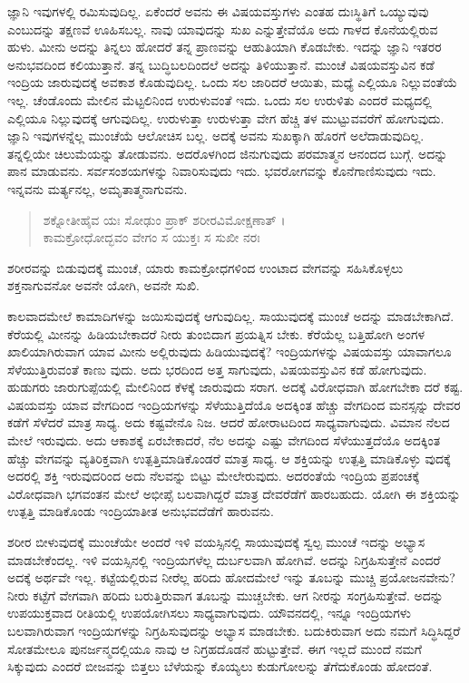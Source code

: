 ಜ್ಞಾನಿ ಇವುಗಳಲ್ಲಿ ರಮಿಸುವುದಿಲ್ಲ. ಏಕೆಂದರೆ ಅವನು ಈ ವಿಷಯವಸ್ತುಗಳು ಎಂತಹ ದುಃಸ್ಥಿತಿಗೆ ಒಯ್ಯುವುವು ಎಂಬುದನ್ನು ತಕ್ಷಣವೆ ಊಹಿಸಬಲ್ಲ. ನಾವು ಯಾವುದನ್ನು ಸುಖ ಎನ್ನುತ್ತೇವೆಯೊ ಅದು ಗಾಳದ ಕೊನೆಯಲ್ಲಿರುವ ಹುಳು. ಮೀನು ಅದನ್ನು ತಿನ್ನಲು ಹೋದರೆ ತನ್ನ ಪ್ರಾಣವನ್ನು ಆಹುತಿಯಾಗಿ ಕೊಡಬೇಕು. ಇದನ್ನು ಜ್ಞಾನಿ ಇತರರ ಅನುಭವದಿಂದ ಕಲಿಯುತ್ತಾನೆ. ತನ್ನ ಬುದ್ಧಿಬಲದಿಂದಲೆ ಅದನ್ನು ತಿಳಿಯುತ್ತಾನೆ. ಮುಂಚೆ ವಿಷಯವಸ್ತುವಿನ ಕಡೆ ಇಂದ್ರಿಯ ಜಾರುವುದಕ್ಕೆ ಅವಕಾಶ ಕೊಡುವುದಿಲ್ಲ. ಒಂದು ಸಲ ಜಾರಿದರೆ ಆಯಿತು, ಮಧ್ಯೆ ಎಲ್ಲಿಯೂ ನಿಲ್ಲುವಂತೆಯೆ ಇಲ್ಲ. ಚೆಂಡೊಂದು ಮೇಲಿನ ಮೆಟ್ಟಲಿನಿಂದ ಉರುಳುವಂತೆ ಇದು. ಒಂದು ಸಲ ಉರುಳಿತು ಎಂದರೆ ಮಧ್ಯದಲ್ಲಿ ಎಲ್ಲಿಯೂ ನಿಲ್ಲುವುದಕ್ಕೆ ಆಗುವುದಿಲ್ಲ. ಉರುಳುತ್ತಾ ಉರುಳುತ್ತಾ ವೇಗ ಹೆಚ್ಚಿ ತಳ ಮುಟ್ಟುವವರೆಗೆ ಹೋಗುವುದು. ಜ್ಞಾನಿ ಇವುಗಳನ್ನೆಲ್ಲ ಮುಂಚೆಯೆ ಆಲೋಚಿಸ ಬಲ್ಲ. ಅದಕ್ಕೆ ಅವನು ಸುಖಕ್ಕಾಗಿ ಹೊರಗೆ ಅಲೆದಾಡುವುದಿಲ್ಲ. ತನ್ನಲ್ಲಿಯೇ ಚಿಲುಮೆಯನ್ನು ತೋಡುವನು. ಅದರೊಳಗಿಂದ ಜಿನುಗುವುದು ಪರಮಾತ್ಮನ ಆನಂದದ ಬುಗ್ಗೆ. ಅದನ್ನು ಪಾನ ಮಾಡುವನು. ಸರ್ವಸಂಶಯಗಳನ್ನು ನಿವಾರಿಸುವುದು ಇದು. ಭವರೋಗವನ್ನು ಕೊನೆಗಾಣಿಸುವುದು ಇದು. ಇನ್ನವನು ಮರ್ತ್ಯನಲ್ಲ, ಅಮೃತಾತ್ಮನಾಗುವನು.

\begin{verse}
ಶಕ್ನೋತೀಹೈವ ಯಃ ಸೋಢುಂ ಪ್ರಾಕ್ ಶರೀರವಿಮೋಕ್ಷಣಾತ್ ।\\ಕಾಮಕ್ರೋಧೋದ್ಭವಂ ವೇಗಂ ಸ ಯುಕ್ತಃ ಸ ಸುಖೀ ನರಃ 
\end{verse}

{\small ಶರೀರವನ್ನು ಬಿಡುವುದಕ್ಕೆ ಮುಂಚೆ, ಯಾರು ಕಾಮಕ್ರೋಧಗಳಿಂದ ಉಂಟಾದ ವೇಗವನ್ನು ಸಹಿಸಿಕೊಳ್ಳಲು ಶಕ್ತನಾಗುವನೋ ಅವನೇ ಯೋಗಿ, ಅವನೇ ಸುಖಿ.}

ಕಾಲವಾದಮೇಲೆ ಕಾಮಾದಿಗಳನ್ನು ಜಯಿಸುವುದಕ್ಕೆ ಆಗುವುದಿಲ್ಲ. ಸಾಯುವುದಕ್ಕೆ ಮುಂಚೆ ಅದನ್ನು ಮಾಡಬೇಕಾಗಿದೆ. ಕೆರೆಯಲ್ಲಿ ಮೀನನ್ನು ಹಿಡಿಯಬೇಕಾದರೆ ನೀರು ತುಂಬಿದಾಗ ಪ್ರಯತ್ನಿಸ ಬೇಕು. ಕೆರೆಯೆಲ್ಲ ಬತ್ತಿಹೋಗಿ ಅಂಗಳ ಖಾಲಿಯಾಗಿರುವಾಗ ಯಾವ ಮೀನು ಅಲ್ಲಿರುವುದು ಹಿಡಿಯುವುದಕ್ಕೆ? ಇಂದ್ರಿಯಗಳನ್ನು ವಿಷಯವಸ್ತು ಯಾವಾಗಲೂ ಸೆಳೆಯುತ್ತಿರುವಂತೆ ಕಾಣು ವುದು. ಅದು ಭರದಿಂದ ಅತ್ತ ಸಾಗುವುದು, ವಿಷಯವಸ್ತುವಿನ ಕಡೆ ಹೋಗುವುದು. ಹುಡುಗರು ಜಾರುಗುಪ್ಪೆಯಲ್ಲಿ ಮೇಲಿನಿಂದ ಕೆಳಕ್ಕೆ ಜಾರುವುದು ಸರಾಗ. ಅದಕ್ಕೆ ವಿರೋಧವಾಗಿ ಹೋಗಬೇಕಾ ದರೆ ಕಷ್ಟ. ವಿಷಯವಸ್ತು ಯಾವ ವೇಗದಿಂದ ಇಂದ್ರಿಯಗಳನ್ನು ಸೆಳೆಯುತ್ತಿದೆಯೊ ಅದಕ್ಕಿಂತ ಹೆಚ್ಚು ವೇಗದಿಂದ ಮನಸ್ಸನ್ನು ದೇವರ ಕಡೆಗೆ ಸೆಳೆದರೆ ಮಾತ್ರ ಸಾಧ್ಯ. ಅದು ಕಷ್ಟವೇನೊ ನಿಜ. ಆದರೆ ಹೋರಾಟದಿಂದ ಸಾಧ್ಯವಾಗುವುದು. ವಿಮಾನ ನೆಲದ ಮೇಲೆ ಇರುವುದು. ಅದು ಆಕಾಶಕ್ಕೆ ಏರಬೇಕಾದರೆ, ನೆಲ ಅದನ್ನು ಎಷ್ಟು ವೇಗದಿಂದ ಸೆಳೆಯುತ್ತದೆಯೊ ಅದಕ್ಕಿಂತ ಹೆಚ್ಚು ವೇಗವನ್ನು ವ್ಯತಿರಿಕ್ತವಾಗಿ ಉತ್ಪತ್ತಿಮಾಡಿಕೊಂಡರೆ ಮಾತ್ರ ಸಾಧ್ಯ. ಆ ಶಕ್ತಿಯನ್ನು ಉತ್ಪತ್ತಿ ಮಾಡಿಕೊಳ್ಳು ವುದಕ್ಕೆ ಅದರಲ್ಲಿ ಶಕ್ತಿ ಇರುವುದರಿಂದ ಅದು ನೆಲವನ್ನು ಬಿಟ್ಟು ಮೇಲೇರುವುದು. ಅದರಂತೆಯೆ ಇಂದ್ರಿಯ ಪ್ರಪಂಚಕ್ಕೆ ವಿರೋಧವಾಗಿ ಭಗವಂತನ ಮೇಲೆ ಅಭೀಪ್ಸೆ ಬಲವಾಗಿದ್ದರೆ ಮಾತ್ರ ದೇವರೆಡೆಗೆ ಹಾರಬಹುದು. ಯೋಗಿ ಈ ಶಕ್ತಿಯನ್ನು ಉತ್ಪತ್ತಿ ಮಾಡಿಕೊಂಡು ಇಂದ್ರಿಯಾತೀತ ಅನುಭವದೆಡೆಗೆ ಹಾರುವನು.

ಶರೀರ ಬೀಳುವುದಕ್ಕೆ ಮುಂಚೆಯೇ ಅಂದರೆ ಇಳಿ ವಯಸ್ಸಿನಲ್ಲಿ ಸಾಯುವುದಕ್ಕೆ ಸ್ವಲ್ಪ ಮುಂಚೆ ಇದನ್ನು ಅಭ್ಯಾಸ ಮಾಡಬೇಕೆಂದಲ್ಲ. ಇಳಿ ವಯಸ್ಸಿನಲ್ಲಿ ಇಂದ್ರಿಯಗಳೆಲ್ಲ ದುರ್ಬಲವಾಗಿ ಹೋಗಿವೆ. ಅದನ್ನು ನಿಗ್ರಹಿಸುತ್ತೇನೆ ಎಂದರೆ ಅದಕ್ಕೆ ಅರ್ಥವೇ ಇಲ್ಲ. ಕಟ್ಟೆಯಲ್ಲಿರುವ ನೀರೆಲ್ಲ ಹರಿದು ಹೋದಮೇಲೆ ಇನ್ನು ತೂಬನ್ನು ಮುಚ್ಚಿ ಪ್ರಯೋಜನವೇನು? ನೀರು ಕಟ್ಟೆಗೆ ವೇಗವಾಗಿ ಹರಿದು ಬರುತ್ತಿರುವಾಗ ತೂಬನ್ನು ಮುಚ್ಚಬೇಕು. ಆಗ ನೀರನ್ನು ಸಂಗ್ರಹಿಸುತ್ತೇವೆ. ಅದನ್ನು ಉಪಯುಕ್ತವಾದ ರೀತಿಯಲ್ಲಿ ಉಪಯೋಗಿಸಲು ಸಾಧ್ಯವಾಗುವುದು. ಯೌವನದಲ್ಲಿ, ಇನ್ನೂ ಇಂದ್ರಿಯಗಳು ಬಲವಾಗಿರುವಾಗ ಇಂದ್ರಿಯಗಳನ್ನು ನಿಗ್ರಹಿಸುವುದನ್ನು ಅಭ್ಯಾಸ ಮಾಡಬೇಕು. ಬದುಕಿರುವಾಗ ಅದು ನಮಗೆ ಸಿದ್ಧಿಸಿದ್ದರೆ ಸೋತಮೇಲೂ ಪುನರ್ಜನ್ಮದಲ್ಲಿಯೂ ನಾವು ಆ ನಿಗ್ರಹದೊಡನೆ ಹುಟ್ಟುತ್ತೇವೆ. ಈಗ ಇಲ್ಲದೆ ಮುಂದೆ ನಮಗೆ ಸಿಕ್ಕುವುದು ಎಂದರೆ ಬೀಜವನ್ನು ಬಿತ್ತಲು ಬೆಳೆಯನ್ನು ಕೊಯ್ಯಲು ಕುಡುಗೋಲನ್ನು ತೆಗೆದುಕೊಂಡು ಹೋದಂತೆ.

